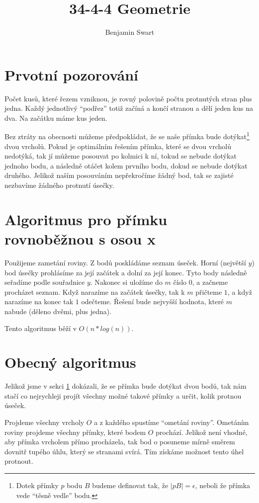 \documentclass{article}
\title{34-4-4 Geometrie}
\author{Benjamin Swart}
\begin{document}
\maketitle

\section{Prvotní pozorování}
\label{intro}

Počet kusů, které řezem vzniknou, je rovný polovině počtu protnutých stran plus jedna. Každý jednotlivý \enquote{podřez} totiž začíná a končí stranou a dělí jeden kus na dva. Na začátku máme kus jeden.

Bez ztráty na obecnosti můžeme předpokládat, že se naše přímka bude dotýkat\footnote{Dotek přímky \(p\) bodu \(B\) budeme definovat tak, že \(|pB| = \epsilon\), neboli že přímka vede \enquote{těsně vedle} bodu.} dvou vrcholů. Pokud je optimálním řešením přímka, které se dvou vrcholů nedotýká, tak jí můžeme posouvat po kolmici k ní, tokud se nebude dotýkat jednoho bodu, a následně otáčet kolem prvního bodu, dokud se nebude dotýkat druhého. Jelikož naším posouváním nepřekročíme žádný bod, tak se zajisté nezbavíme žádného protnutí úsečky.

\section{Algoritmus pro přímku rovnoběžnou s osou x}

Použijeme zametání roviny. Z bodů poskládáme seznam úseček. Horní (největší \(y\)) bod úsečky prohlásíme za její začátek a dolní za její konec. Tyto body následně seřadíme podle souřadnice \(y\). Nakonec si uložíme do \(m\) číslo \(0\), a začneme procházet seznam. Když narazíme na začátek úsečky, tak k \(m\) přičteme \(1\), a když narazíme na konec tak \(1\) odečteme. Řešení bude nejvyšší hodnota, které \(m\) nabude (děleno dvěmi, plus jedna).

Tento algoritmus běží v \(O(n*log(n))\).

\section{Obecný algoritmus}

Jelikož jsme v sekci \ref{intro} dokázali, že se přímka bude dotýkat dvou bodů, tak nám stačí co nejrychleji projít všechny možné takové přímky a určit, kolik protnou úseček.

Projdeme všechny vrcholy \(O\) a z každého spustíme \enquote{ometání roviny}. Ometáním roviny projdeme všechny přímky, které bodem \(O\) prochází. Jelikož není vhodné, aby přímka vrcholem přímo procházela, tak bod o posuneme mírně směrem dovnitř tupého úhlu, který se stranami svírá. Tím získáme možnost tento úhel protnout.
\end{document}
